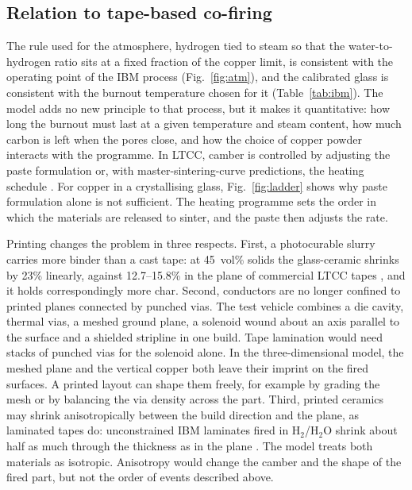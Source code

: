 \subsection{Relation to tape-based co-firing}

The rule used for the atmosphere, hydrogen tied to steam so that the water-to-hydrogen ratio sits at a fixed fraction of the copper limit, is consistent with the operating point of the IBM process (Fig.~\ref{fig:atm}), and the calibrated glass is consistent with the burnout temperature chosen for it (Table~\ref{tab:ibm}). The model adds no new principle to that process, but it makes it quantitative: how long the burnout must last at a given temperature and steam content, how much carbon is left when the pores close, and how the choice of copper powder interacts with the programme. In LTCC, camber is controlled by adjusting the paste formulation \cite{chang1998effects} or, with master-sintering-curve predictions, the heating schedule \cite{brandt2013improved}. For copper in a crystallising glass, Fig.~\ref{fig:ladder} shows why paste formulation alone is not sufficient. The heating programme sets the order in which the materials are released to sinter, and the paste then adjusts the rate.

Printing changes the problem in three respects. First, a photocurable slurry carries more binder than a cast tape: at 45~vol\% solids the glass-ceramic shrinks by 23\% linearly, against 12.7--15.8\% in the plane of commercial LTCC tapes \cite{dupont951tds,ferroa6mtds}, and it holds correspondingly more char. Second, conductors are no longer confined to printed planes connected by punched vias. The test vehicle combines a die cavity, thermal vias, a meshed ground plane, a solenoid wound about an axis parallel to the surface and a shielded stripline in one build. Tape lamination would need stacks of punched vias for the solenoid alone. In the three-dimensional model, the meshed plane and the vertical copper both leave their imprint on the fired surfaces. A printed layout can shape them freely, for example by grading the mesh or by balancing the via density across the part. Third, printed ceramics may shrink anisotropically between the build direction and the plane, as laminated tapes do: unconstrained IBM laminates fired in H$_2$/H$_2$O shrink about half as much through the thickness as in the plane \cite{dubetsky1982process}. The model treats both materials as isotropic. Anisotropy would change the camber and the shape of the fired part, but not the order of events described above.

